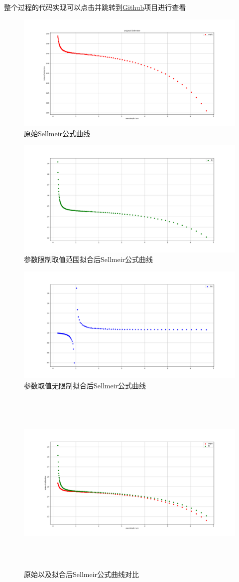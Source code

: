\documentclass[12pt, a4paper, oneside, UTF8]{ctexart}
\begin{document}
整个过程的代码实现可以点击并跳转到\href{https://github.com/ZuXianA/Fit_Sellmeier.git}{Github}项目进行查看
\begin{figure}[htbp]
    \centering
    \includegraphics[width=.81\textwidth]{origin.png}
    \caption{原始Sellmeir公式曲线}
\end{figure}
\begin{figure}[htbp]
    \centering
    \includegraphics[width=.81\textwidth]{fit.png}
    \caption{参数限制取值范围拟合后Sellmeir公式曲线}
\end{figure}
\begin{figure}[htbp]
    \centering
    \includegraphics[width=.81\textwidth]{fitnew.png}
    \caption{参数取值无限制拟合后Sellmeir公式曲线}
\end{figure}

\newpage
\begin{figure}[htbp]
    \centering
    \includegraphics[width=15cm,height=9cm]{OandF.png}
    \caption{原始以及拟合后Sellmeir公式曲线对比}
\end{figure}
\end{document}
